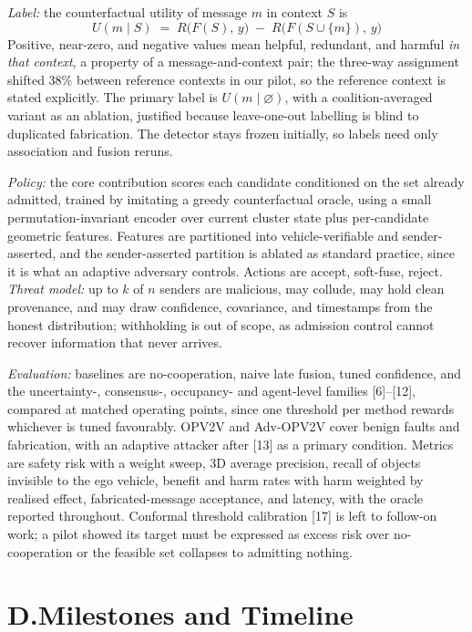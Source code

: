 \documentclass[11pt]{article}
\begin{document}
\emph{Label:} the counterfactual utility of message $m$ in context $S$ is
\[
  U(m \mid S) \;=\; R\bigl(F(S),\, y\bigr) \;-\; R\bigl(F(S \cup \{m\}),\, y\bigr)
\]
Positive, near-zero, and negative values mean helpful, redundant, and harmful
\emph{in that context}, a property of a message-and-context pair; the three-way
assignment shifted 38\% between reference contexts in our pilot, so the
reference context is stated explicitly. The primary label is
$U(m \mid \varnothing)$, with a coalition-averaged variant as an ablation,
justified because leave-one-out labelling is blind to duplicated fabrication.
The detector stays frozen initially, so labels need only association and fusion
reruns.

\emph{Policy:} the core contribution scores each candidate conditioned on the
set already admitted, trained by imitating a greedy counterfactual oracle, using
a small permutation-invariant encoder over current cluster state plus
per-candidate geometric features. Features are partitioned into
vehicle-verifiable and sender-asserted, and the sender-asserted partition is
ablated as standard practice, since it is what an adaptive adversary controls.
Actions are accept, soft-fuse, reject. \emph{Threat model:} up to $k$ of $n$
senders are malicious, may collude, may hold clean provenance, and may draw
confidence, covariance, and timestamps from the honest distribution;
withholding is out of scope, as admission control cannot recover information
that never arrives.

\emph{Evaluation:} baselines are no-cooperation, naive late fusion, tuned
confidence, and the uncertainty-, consensus-, occupancy- and agent-level
families [6]--[12], compared at matched operating points, since one threshold
per method rewards whichever is tuned favourably. OPV2V and Adv-OPV2V cover
benign faults and fabrication, with an adaptive attacker after [13] as a primary
condition. Metrics are safety risk with a weight sweep, 3D average precision,
recall of objects invisible to the ego vehicle, benefit and harm rates with harm
weighted by realised effect, fabricated-message acceptance, and latency, with
the oracle reported throughout. Conformal threshold calibration [17] is left to
follow-on work; a pilot showed its target must be expressed as excess risk over
no-cooperation or the feasible set collapses to admitting nothing.

\section{D.\quad Milestones and Timeline}
\end{document}
